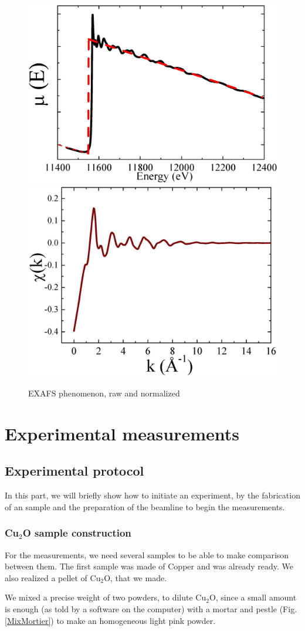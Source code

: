 \documentclass[11pt,a4paper,oneside]{report}
\begin{document}
\begin{figure}[H]
    \begin{center}
        \includegraphics[height=0.35\textwidth]{Images/EXAFS2}
        \includegraphics[height=0.35\textwidth]{Images/relativeEXAFS}
        \caption{EXAFS phenomenon, raw and normalized}
        \label{exafsgraph}
    \end{center}
\end{figure}

\chapter{Experimental measurements}

\section{Experimental protocol}
In this part, we will briefly show how to initiate an experiment, by the fabrication of an sample and the preparation of the beamline to begin the measurements.

\subsection{Cu$_2$O sample construction}

For the measurements, we need several samples to be able to make comparison between them. The first sample was made of Copper and was already ready. We also realized a pellet of Cu$_2$O, that we made.

 We mixed a precise weight of two powders, to dilute Cu$_2$O, since a small amount is enough (as told by a software on the computer) with a mortar and pestle (Fig. \ref{MixMortier}) to make an homogeneous light pink powder.
\end{document}
